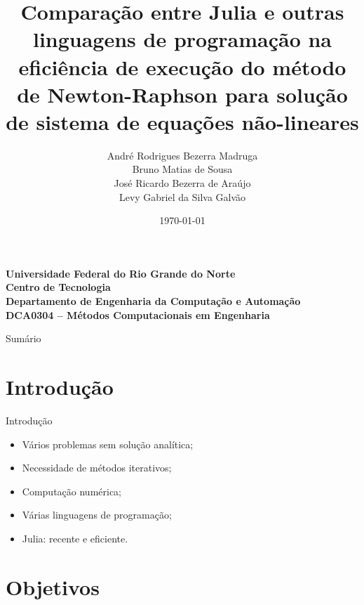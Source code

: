 \documentclass[aspectratio=1610]{beamer}
\title{Comparação entre Julia e outras linguagens de programação na eficiência de execução do método de Newton-Raphson para solução de sistema de equações não-lineares}
\author{{\scriptsize André Rodrigues Bezerra Madruga \\ 
		Bruno Matias de Sousa \\ 
		José Ricardo Bezerra de Araújo \\ 
		Levy Gabriel da Silva Galvão \\}}
\date{\today}
\begin{document}
\begin{frame}

\begin{minipage}{1\linewidth}
  \centering
	\begin{footnotesize}
	 \textbf{Universidade Federal do Rio Grande do Norte} \\ 
	\textbf{Centro de Tecnologia} \\ 
	\textbf{Departamento de Engenharia da Computação e Automação} \\ 
	\textbf{DCA0304 -- Métodos Computacionais em Engenharia} \\
	 \end{footnotesize} 
\end{minipage}

\titlepage

\end{frame}

\begin{frame}{Sumário}
\tableofcontents
\end{frame}

\section{Introdução}

\begin{frame}{Introdução}

\begin{itemize}
 \item Vários problemas sem solução analítica; \pause
 
 \item Necessidade de métodos iterativos;\pause
 
 \item Computação numérica;\pause
 
 \item Várias linguagens de programação;\pause
 
 \item Julia: recente e eficiente.
\end{itemize}

\end{frame}

\section{Objetivos}
\end{document}
